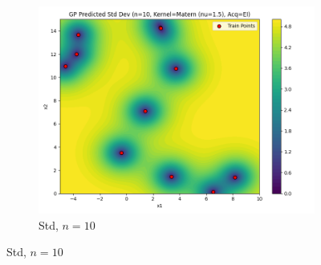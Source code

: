 \documentclass[a4paper,12pt]{article}
\begin{document}
\begin{figure}[H]
\begin{subfigure}{0.3\textwidth}
    \includegraphics[width=\linewidth]{Task-02/images/gp_std_matern_n10_EI.png}
    \caption{Std, $n=10$}
\end{subfigure}


\end{figure}
\end{document}
